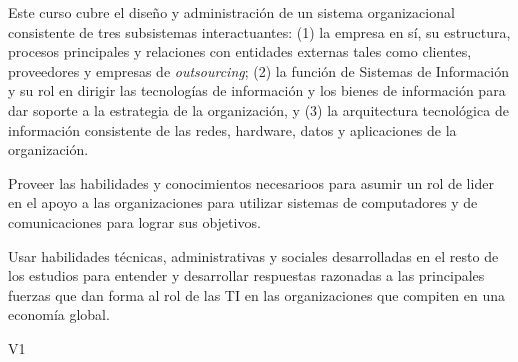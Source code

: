 \begin{syllabus}


\begin{justification}
	Este curso cubre el diseño y administración de un sistema organizacional consistente de tres subsistemas interactuantes: (1) la empresa en sí­, su estructura, procesos principales y relaciones con entidades externas tales como clientes, proveedores y empresas de \emph{outsourcing}; (2) la función de Sistemas de Información y su rol en dirigir las tecnologías de información y los bienes de información para dar soporte a la estrategia de la organización, y (3) la arquitectura tecnológica de información consistente de las redes, hardware, datos y aplicaciones de la organización. 
	\end{justification}
	
	\begin{goals}
	\item Proveer las habilidades y conocimientos necesarioos para asumir un rol de lider en el apoyo a las organizaciones para utilizar sistemas de computadores y de comunicaciones para lograr sus objetivos. 
	\item Usar habilidades técnicas, administrativas y sociales desarrolladas en el resto de los estudios para entender y desarrollar respuestas razonadas a las principales fuerzas que dan forma al rol de las TI en las organizaciones que compiten en una economía global.
	\end{goals}
	
	\begin{outcomes}{V1}
		\item {}
		\item {}
		\item {}
		\item {}
		\item {}
		\item {}
		\item {}
		\item {}
		\item {}
	\end{outcomes}
	

\end{syllabus}
